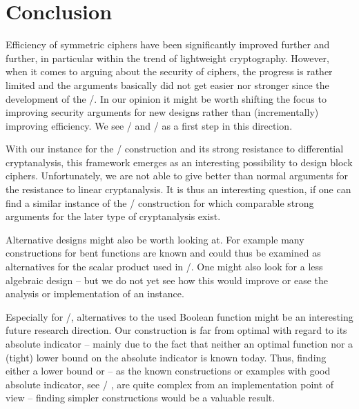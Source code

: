 \section{Conclusion}
Efficiency of symmetric ciphers have been significantly improved further and further, in particular within the trend of lightweight cryptography.
However, when it comes to arguing about the security of ciphers, the progress is rather limited and the arguments basically did not get easier nor stronger since the development of the \AES/.
In our opinion it might be worth shifting the focus to improving security arguments for new designs rather than (incrementally) improving efficiency.
We see \bison/ and \wisent/ as a first step in this direction.

With our instance for the \WSN/ construction and its strong resistance to differential cryptanalysis, this framework emerges as an interesting possibility to design block ciphers.
Unfortunately, we are not able to give better than normal arguments for the resistance to linear cryptanalysis.
It is thus an interesting question, if one can find a similar instance of the \WSN/ construction for which comparable strong arguments for the later type of cryptanalysis exist.

Alternative designs might also be worth looking at.
For example many constructions for bent functions are known and could thus be examined as alternatives for the scalar product used in \bison/.
One might also look for a less algebraic design -- but we do not yet see how this would improve or ease the analysis or implementation of an instance.

Especially for \wisent/, alternatives to the used Boolean function might be an interesting future research direction.
Our construction is far from optimal with regard to its absolute indicator -- mainly due to the fact that neither an optimal function nor a (tight) lower bound on the absolute indicator is known today.
Thus, finding either a lower bound or -- as the known constructions or examples with good absolute indicator, see \eg/ , are quite complex from an implementation point of view -- finding simpler constructions would be a valuable result.

